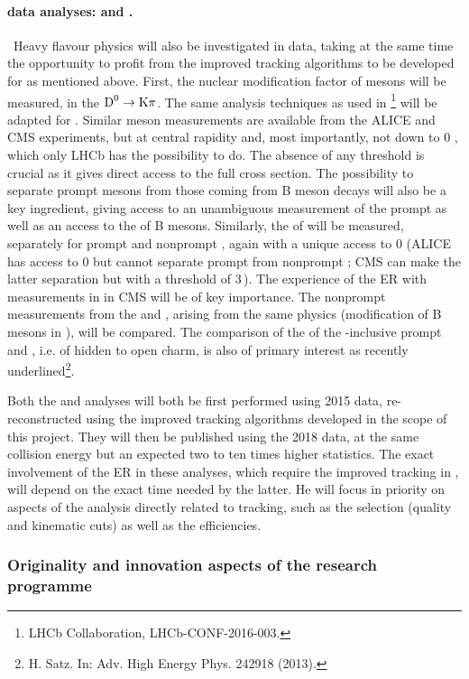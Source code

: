 \documentclass[a4paper,11pt]{article}
\newcommand{\ER}{ER\xspace}
\begin{document}
\paragraph{\pbpb data analyses: \Dz and \Jpsi. }\ 
Heavy flavour physics will also be investigated in \pbpb data, taking at the same time the opportunity to profit from the improved tracking algorithms to be developed for \pbpb as mentioned above. 
%
First, the nuclear modification factor of \Dz mesons will be measured, in the $\text{D}^0 \to \text{K}\pi$. The same analysis techniques as used in \pPb\footnote{LHCb Collaboration, LHCb-CONF-2016-003.} will be adapted for \pbpb. Similar \Dz meson measurements are available from the ALICE and CMS experiments, but at central rapidity and, most importantly, not down to 0 \pt, which only LHCb has the possibility to do. The absence of any \pt threshold is crucial as it gives direct access to the full cross section. The possibility to separate
prompt \Dz mesons from those coming from B meson decays will also be a key ingredient, giving access to an unambiguous measurement of the prompt \Dz as well as an access to the \raa
of B mesons.
%
Similarly, the \raa of \Jpsi will be measured, separately for prompt and nonprompt \Jpsi, again with a unique access to 0 \pt (ALICE has access to 0 \pt \Jpsi but cannot separate prompt from nonprompt \Jpsi; CMS can make the latter separation but with a \pt threshold of 3\,\GeVc). The experience of the \ER with \Jpsi measurements in \pbpb
in CMS will be of key importance. The nonprompt measurements from the \Dz and \Jpsi, arising from the same physics (modification of B mesons in \pbpb), will be compared. The comparison of the \raa of the \pt-inclusive prompt \Jpsi and \Dz, i.e. of hidden to open charm, is also of primary interest as recently underlined\footnote{H. Satz. In: Adv. High Energy Phys. 242918 (2013).}.

Both the \Dz and \Jpsi analyses will both be first performed using 2015 \pbpb data, re-reconstructed using the improved tracking algorithms developed in the scope of this project. They will then be published using the 2018 data, at the same collision energy but an expected two to ten times higher statistics. The exact involvement of the \ER in these analyses, which require the improved tracking in \pbpb, will depend on the exact time needed by the latter. He will focus in priority on aspects of the analysis directly related to tracking, such as the selection (quality and kinematic cuts) as well as the efficiencies.


\subsubsection{Originality and innovation aspects of the research programme}
\end{document}
